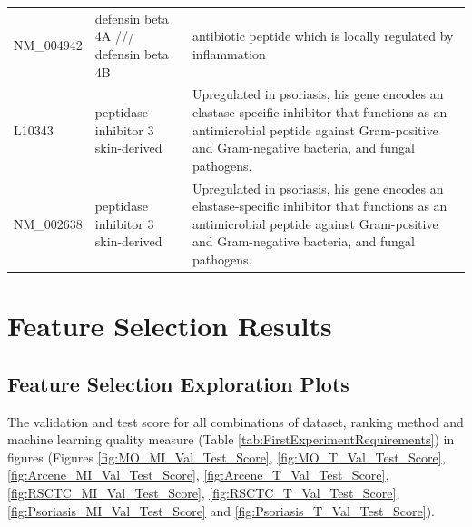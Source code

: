 \documentclass[10pt,a4paper]{report}
\begin{document}
\begin{table}[]
\begin{tabular}{l|p{5cm} p{8cm}}
			NM\_004942         & defensin  beta 4A /// defensin beta 4B                                                                                  & antibiotic peptide which is locally regulated by inflammation \cite{jansen2009beta}                                                                                                                                                                             \\
			L10343             & peptidase inhibitor 3  skin-derived                                                                                     & Upregulated in psoriasis, his gene encodes an elastase-specific inhibitor that functions as an antimicrobial peptide against Gram-positive and Gram-negative bacteria, and fungal pathogens. \cite{gudjonsson2010assessment, roesner2017inflammatory}                                              \\
			NM\_002638 &  peptidase inhibitor 3  skin-derived                                                                                           & Upregulated in psoriasis, his gene encodes an elastase-specific inhibitor that functions as an antimicrobial peptide against Gram-positive and Gram-negative bacteria, and fungal pathogens. \cite{gudjonsson2010assessment, roesner2017inflammatory}                                                                                        \\ \hline                                                                                                                                                                                                                                         
		\end{tabular}
	\end{table}
		\chapter{Feature Selection Results}
	
	\section{Feature Selection Exploration Plots}
	\label{app:FeatureSelectionExplorationPlots}
	
	The validation and test score for all combinations of dataset, ranking method and machine learning quality measure (Table \ref{tab:FirstExperimentRequirements}) in figures (Figures \ref{fig:MO_MI_Val_Test_Score}, \ref{fig:MO_T_Val_Test_Score}, \ref{fig:Arcene_MI_Val_Test_Score}, \ref{fig:Arcene_T_Val_Test_Score}, \ref{fig:RSCTC_MI_Val_Test_Score}, \ref{fig:RSCTC_T_Val_Test_Score}, \ref{fig:Psoriasis_MI_Val_Test_Score} and \ref{fig:Psoriasis_T_Val_Test_Score}). 
	
\end{document}
